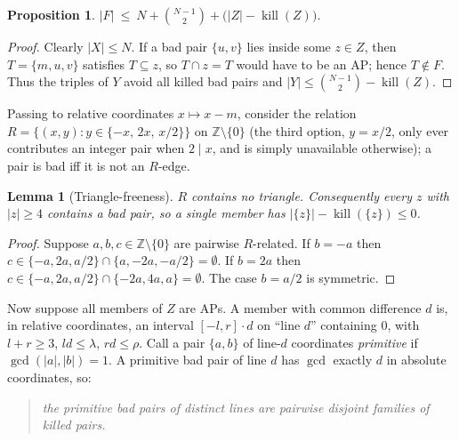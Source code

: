 \documentclass[11pt]{article}
\newtheorem{lemma}[theorem]{Lemma}
\newtheorem{proposition}[theorem]{Proposition}
\theoremstyle{definition}
\newcommand{\Z}{\mathbb{Z}}
\newcommand{\killop}{\operatorname{kill}}
\begin{document}
\begin{proposition}\label{prop:red}
$|F|\ \le\ N+\binom{N-1}{2}+\big(|Z|-\killop(Z)\big)$.
\end{proposition}

\begin{proof}
Clearly $|X|\le N$. If a bad pair $\{u,v\}$ lies inside some $z\in Z$, then $T=\{m,u,v\}$ satisfies $T\subseteq z$, so $T\cap z=T$ would have to be an AP; hence $T\notin F$. Thus the triples of $Y$ avoid all killed bad pairs and $|Y|\le\binom{N-1}{2}-\killop(Z)$.
\end{proof}

Passing to relative coordinates $x\mapsto x-m$, consider the relation
$R=\{(x,y): y\in\{-x,\,2x,\,x/2\}\}$ on $\Z\setminus\{0\}$ (the third option, $y=x/2$, only ever contributes an integer pair when $2\mid x$, and is simply unavailable otherwise);
a pair is bad iff it is not an $R$-edge.

\begin{lemma}[Triangle-freeness]\label{lem:tri}
$R$ contains no triangle. Consequently every $z$ with $|z|\ge 4$ contains a bad pair, so a single member has $|\{z\}|-\killop(\{z\})\le 0$.
\end{lemma}

\begin{proof}
Suppose $a,b,c\in\Z\setminus\{0\}$ are pairwise $R$-related. If $b=-a$ then $c\in\{-a,2a,a/2\}\cap\{a,-2a,-a/2\}=\emptyset$. If $b=2a$ then $c\in\{-a,2a,a/2\}\cap\{-2a,4a,a\}=\emptyset$. The case $b=a/2$ is symmetric.
\end{proof}

Now suppose all members of $Z$ are APs. A member with common difference $d$ is, in relative coordinates, an interval $[-l,r]\cdot d$ on ``line $d$'' containing $0$, with $l+r\ge 3$, $ld\le\lambda$, $rd\le\rho$. Call a pair $\{a,b\}$ of line-$d$ coordinates \emph{primitive} if $\gcd(|a|,|b|)=1$. A primitive bad pair of line $d$ has $\gcd$ exactly $d$ in absolute coordinates, so:

\begin{quote}\emph{the primitive bad pairs of distinct lines are pairwise disjoint families of killed pairs.}\end{quote}
\end{document}
